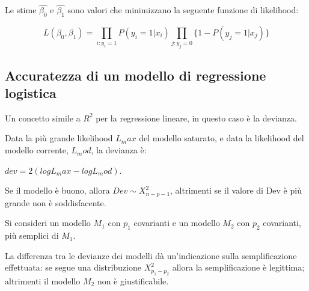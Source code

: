 Le stime $\hat{\beta_0}$ e $\hat{\beta_1}$ sono valori che minimizzano
la seguente funzione di likelihood:

\begin{equation}
L(\beta_0, \beta_1) = \prod_{i:y_i = 1} P(y_i=1|x_i)
\prod_{j:y_j = 0} \{1 - P(y_j=1|x_j)\}
\end{equation}

\subsection{Accuratezza di un modello di regressione logistica}

Un concetto simile a $R^2$ per la regressione lineare, in questo caso è la
devianza.

Data la più grande likelihood $L_max$ del modello saturato, e data la
likelihood del modello corrente, $L_mod$, la devianza è:

$dev = 2(log L_max - log L_mod)$.

Se il modello è buono, allora $Dev \sim X^2_{n-p-1}$, altrimenti se il valore
di Dev è più grande non è soddisfacente.

Si consideri un modello $M_1$ con $p_1$ covarianti e un modello $M_2$ con
$p_2$ covarianti, più semplici di $M_1$.

La differenza tra le devianze dei modelli dà un'indicazione sulla semplificazione
effettuata: se segue una distribuzione $X^2_{p_1 - p_2}$ allora la semplificazione
è legittima; altrimenti il modello $M_2$ non è giustificabile.








